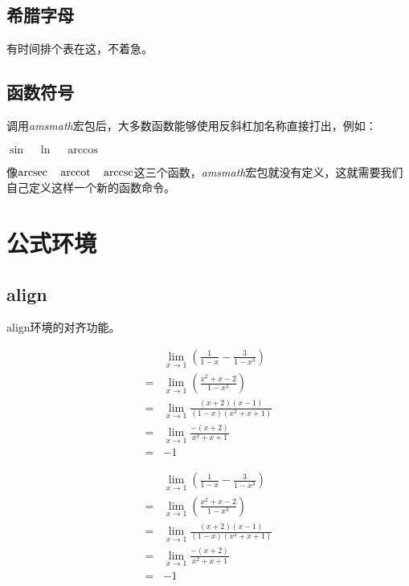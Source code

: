 \subsection{希腊字母}
有时间排个表在这，不着急。

\subsection{函数符号}
调用\emph{amsmath}宏包后，大多数函数能够使用反斜杠加名称直接打出，例如：

\begin{codeshow}
$ \sin \quad \ln \quad \arccos $
\end{codeshow}

像$ \arcsec \quad \arccot \quad \arccsc $这三个函数，\emph{amsmath}宏包就没有定义，这就需要我们自己定义这样一个新的函数命令。
\begin{latex}
\DeclareMathOperator{\arcsec}{arcsec}
\DeclareMathOperator{\arccot}{arccot}
\DeclareMathOperator{\arccsc}{arccsc}
\end{latex}

\section{公式环境}

\subsection{align}
align环境的对齐功能。
\begin{latex}
\begin{align*}
&\lim\limits_{x\to 1}\left(\frac{1}{1-x}-\frac{3}{1-x^3}\right)\\
= &\lim\limits_{x\to 1}\left(\frac{x^2+x-2}{1-x^3}\right)  \\
=& \lim\limits_{x\to 1}\frac{(x+2)(x-1)}{(1-x)(x^2+x+1)}\\
=& \lim\limits_{x\to 1}\frac{-(x+2)}{x^2+x+1}\\
=& -1
\end{align*}
\end{latex}

\begin{align*}
&\lim\limits_{x\to 1}\left(\frac{1}{1-x}-\frac{3}{1-x^3}\right)\\
= &\lim\limits_{x\to 1}\left(\frac{x^2+x-2}{1-x^3}\right)  \\
=& \lim\limits_{x\to 1}\frac{(x+2)(x-1)}{(1-x)(x^2+x+1)}\\
=& \lim\limits_{x\to 1}\frac{-(x+2)}{x^2+x+1}\\
=& -1
\end{align*}

